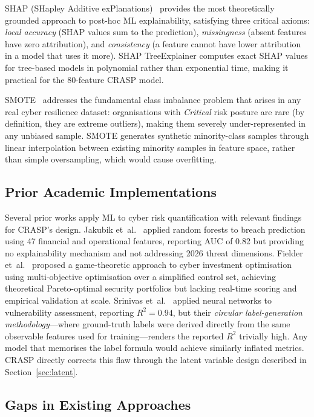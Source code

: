 \documentclass[journal]{IEEEtran}
\begin{document}
SHAP (SHapley Additive exPlanations)~\cite{lundberg2017shap} provides the
most theoretically grounded approach to post-hoc ML explainability, satisfying
three critical axioms: \emph{local accuracy} (SHAP values sum to the
prediction), \emph{missingness} (absent features have zero attribution), and
\emph{consistency} (a feature cannot have lower attribution in a model that
uses it more). SHAP TreeExplainer computes exact SHAP values for tree-based
models in polynomial rather than exponential time, making it practical for
the 80-feature CRASP model.

SMOTE~\cite{chawla2002smote} addresses the fundamental class imbalance problem
that arises in any real cyber resilience dataset: organisations with
\emph{Critical} risk posture are rare (by definition, they are extreme
outliers), making them severely under-represented in any unbiased sample.
SMOTE generates synthetic minority-class samples through linear interpolation
between existing minority samples in feature space, rather than simple
oversampling, which would cause overfitting.

\subsection{Prior Academic Implementations}

Several prior works apply ML to cyber risk quantification with relevant
findings for CRASP's design. Jakubik et~al.~\cite{jakubik2021} applied
random forests to breach prediction using 47 financial and operational
features, reporting AUC of 0.82 but providing no explainability mechanism
and not addressing 2026 threat dimensions. Fielder et~al.~\cite{fielder2016}
proposed a game-theoretic approach to cyber investment optimisation using
multi-objective optimisation over a simplified control set, achieving
theoretical Pareto-optimal security portfolios but lacking real-time scoring
and empirical validation at scale. Srinivas et~al.~\cite{srinivas2019}
applied neural networks to vulnerability assessment, reporting $R^2 = 0.94$,
but their \emph{circular label-generation methodology}---where ground-truth
labels were derived directly from the same observable features used for
training---renders the reported $R^2$ trivially high. Any model that
memorises the label formula would achieve similarly inflated metrics.
CRASP directly corrects this flaw through the latent variable design
described in Section~\ref{sec:latent}.

\subsection{Gaps in Existing Approaches}
\end{document}
